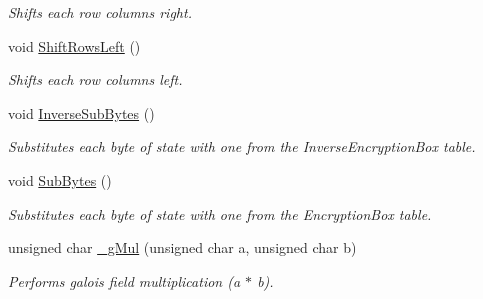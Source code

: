 \begin{DoxyCompactItemize}
\begin{DoxyCompactList}\small\item\em Shifts each row columns right. \item\end{DoxyCompactList}\item 
void \hyperlink{class_thread_message_item_encrypt_aebea56624861f0e8e05a66ddfa7016fb}{ShiftRowsLeft} ()
\begin{DoxyCompactList}\small\item\em Shifts each row columns left. \item\end{DoxyCompactList}\item 
void \hyperlink{class_thread_message_item_encrypt_ae66d87ce29ad59e32a6d514c80b40c56}{InverseSubBytes} ()
\begin{DoxyCompactList}\small\item\em Substitutes each byte of state with one from the InverseEncryptionBox table. \item\end{DoxyCompactList}\item 
void \hyperlink{class_thread_message_item_encrypt_adc3e2a7317c107264cd543d368f1846c}{SubBytes} ()
\begin{DoxyCompactList}\small\item\em Substitutes each byte of state with one from the EncryptionBox table. \item\end{DoxyCompactList}\item 
unsigned char \hyperlink{class_thread_message_item_encrypt_a5cc560f8529b6fc713501981d89f3ba1}{\_\-gMul} (unsigned char a, unsigned char b)
\begin{DoxyCompactList}\small\item\em Performs galois field multiplication ({\itshape a\/} $\ast$ {\itshape b\/}). \item\end{DoxyCompactList}\end{DoxyCompactItemize}
